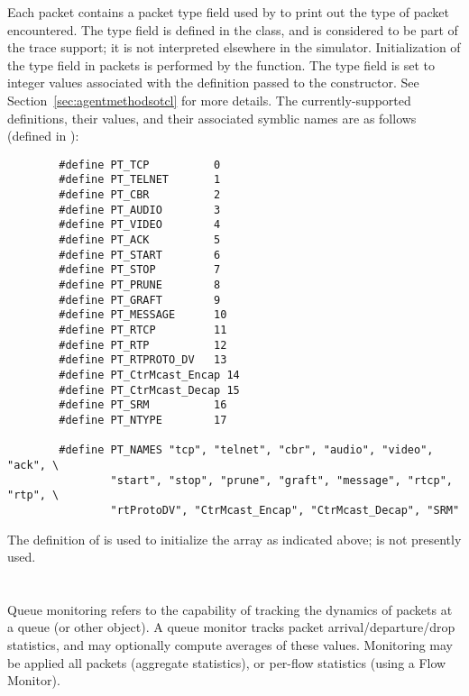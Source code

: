 Each packet contains a packet type field used by 
to print out the type of packet encountered.
The type field is defined in the  class, and is considered
to be part of the trace support; it is not interpreted
elsewhere in the simulator.
Initialization of the type field in packets is performed by the
 function.
The type field is set to integer values associated with the
definition passed to the  constructor.
See Section~\ref{sec:agentmethodsotcl} for more details.
The currently-supported definitions, their values, and their
associated symblic names are as follows
(defined in ):
\begin{small}
\begin{verbatim}
        #define PT_TCP          0
        #define PT_TELNET       1
        #define PT_CBR          2
        #define PT_AUDIO        3
        #define PT_VIDEO        4
        #define PT_ACK          5
        #define PT_START        6
        #define PT_STOP         7
        #define PT_PRUNE        8
        #define PT_GRAFT        9
        #define PT_MESSAGE      10
        #define PT_RTCP         11
        #define PT_RTP          12
        #define PT_RTPROTO_DV   13
        #define PT_CtrMcast_Encap 14
        #define PT_CtrMcast_Decap 15
        #define PT_SRM          16
        #define PT_NTYPE        17

        #define PT_NAMES "tcp", "telnet", "cbr", "audio", "video", "ack", \
                "start", "stop", "prune", "graft", "message", "rtcp", "rtp", \
                "rtProtoDV", "CtrMcast_Encap", "CtrMcast_Decap", "SRM"

\end{verbatim}
\end{small}
The definition of  is used to initialize the
 array as indicated above;
\code{PT_NTYPE} is not presently used.

\section{}

Queue monitoring refers to the capability of tracking the
dynamics of packets at a queue (or other object).
A queue monitor tracks packet arrival/departure/drop statistics,
and may optionally compute averages of these values.
Monitoring may be applied all packets (aggregate statistics), or
per-flow statistics (using a Flow Monitor).

